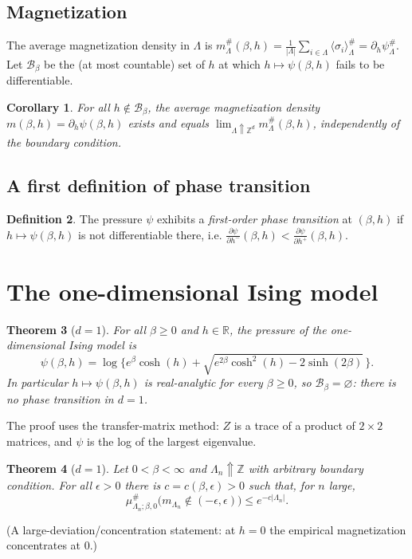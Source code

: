 \documentclass[11pt]{article}
\theoremstyle{plain}
\newtheorem{theorem}{Theorem}
\newtheorem{corollary}[theorem]{Corollary}
\theoremstyle{definition}
\newtheorem{definition}[theorem]{Definition}
\theoremstyle{remark}
\newcommand{\Z}{\mathbb{Z}}
\newcommand{\R}{\mathbb{R}}
\newcommand{\incr}{\Uparrow}        %
\newcommand{\La}{\Lambda}
\newcommand{\sg}{\sigma}
\newcommand{\bdy}{\#}
\newcommand{\avg}[1]{\langle #1 \rangle}
\newcommand{\bc}{\mathscr{B}}
\begin{document}
\subsection{Magnetization}
The average magnetization density in $\La$ is
$m^{\bdy}_\La(\beta,h)=\frac1{|\La|}\sum_{i\in\La}\avg{\sg_i}^{\bdy}_\La
=\partial_h\psi^{\bdy}_\La$. Let $\bc_\beta$ be the (at most countable) set of
$h$ at which $h\mapsto\psi(\beta,h)$ fails to be differentiable.

\begin{corollary}
For all $h\notin\bc_\beta$, the average magnetization density
$m(\beta,h)=\partial_h\psi(\beta,h)$ exists and equals
$\lim_{\La\incr\Z^d} m^{\bdy}_\La(\beta,h)$, independently of the boundary
condition.
\end{corollary}

\subsection{A first definition of phase transition}
\begin{definition}
The pressure $\psi$ exhibits a \emph{first-order phase transition} at
$(\beta,h)$ if $h\mapsto\psi(\beta,h)$ is not differentiable there, i.e.
$\frac{\partial\psi}{\partial h^-}(\beta,h)
   <\frac{\partial\psi}{\partial h^+}(\beta,h)$.
\end{definition}

\section{The one-dimensional Ising model}
\begin{theorem}[$d=1$]
For all $\beta\ge0$ and $h\in\R$, the pressure of the one-dimensional Ising
model is
\[
  \psi(\beta,h)
    = \log\!\Big\{ e^{\beta}\cosh(h)
        + \sqrt{ e^{2\beta}\cosh^2(h) - 2\sinh(2\beta)}\,\Big\}. \tag{3.10}
\]
In particular $h\mapsto\psi(\beta,h)$ is real-analytic for every $\beta\ge0$,
so $\bc_\beta=\varnothing$: there is \emph{no} phase transition in $d=1$.
\end{theorem}
\noindent The proof uses the transfer-matrix method: $Z$ is a trace of a
product of $2\times2$ matrices, and $\psi$ is the log of the largest eigenvalue.

\begin{theorem}[$d=1$]
Let $0<\beta<\infty$ and $\La_n\incr\Z$ with arbitrary boundary condition. For
all $\epsilon>0$ there is $c=c(\beta,\epsilon)>0$ such that, for $n$ large,
\[
  \mu^{\bdy}_{\La_n;\beta,0}\big( m_{\La_n}\notin(-\epsilon,\epsilon)\big)
    \le e^{-c|\La_n|}. \tag{3.12}
\]
\end{theorem}
\noindent (A large-deviation/concentration statement: at $h=0$ the empirical
magnetization concentrates at $0$.)
\end{document}

